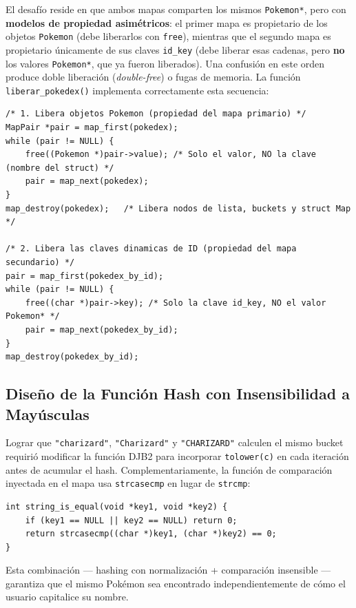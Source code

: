 \documentclass[12pt, letterpaper]{article}
\begin{document}
El desafío reside en que ambos mapas comparten los mismos \texttt{Pokemon*}, pero con \textbf{modelos de propiedad asimétricos}: el primer mapa es propietario de los objetos \texttt{Pokemon} (debe liberarlos con \texttt{free}), mientras que el segundo mapa es propietario únicamente de sus claves \texttt{id\_key} (debe liberar esas cadenas, pero \textbf{no} los valores \texttt{Pokemon*}, que ya fueron liberados). Una confusión en este orden produce doble liberación (\emph{double-free}) o fugas de memoria. La función \texttt{liberar\_pokedex()} implementa correctamente esta secuencia:

\begin{lstlisting}[caption={Liberación correcta y ordenada en \texttt{liberar\_pokedex()}}]
/* 1. Libera objetos Pokemon (propiedad del mapa primario) */
MapPair *pair = map_first(pokedex);
while (pair != NULL) {
    free((Pokemon *)pair->value); /* Solo el valor, NO la clave (nombre del struct) */
    pair = map_next(pokedex);
}
map_destroy(pokedex);   /* Libera nodos de lista, buckets y struct Map */

/* 2. Libera las claves dinamicas de ID (propiedad del mapa secundario) */
pair = map_first(pokedex_by_id);
while (pair != NULL) {
    free((char *)pair->key); /* Solo la clave id_key, NO el valor Pokemon* */
    pair = map_next(pokedex_by_id);
}
map_destroy(pokedex_by_id);
\end{lstlisting}

\subsection{Diseño de la Función Hash con Insensibilidad a Mayúsculas}

Lograr que \texttt{"charizard"}, \texttt{"Charizard"} y \texttt{"CHARIZARD"} calculen el mismo bucket requirió modificar la función DJB2 para incorporar \texttt{tolower(c)} en cada iteración antes de acumular el hash. Complementariamente, la función de comparación inyectada en el mapa usa \texttt{strcasecmp} en lugar de \texttt{strcmp}:

\begin{lstlisting}[caption={Comparación insensible a mayúsculas en \texttt{pokehash.c}}]
int string_is_equal(void *key1, void *key2) {
    if (key1 == NULL || key2 == NULL) return 0;
    return strcasecmp((char *)key1, (char *)key2) == 0;
}
\end{lstlisting}

Esta combinación --- hashing con normalización + comparación insensible --- garantiza que el mismo Pokémon sea encontrado independientemente de cómo el usuario capitalice su nombre.
\end{document}
